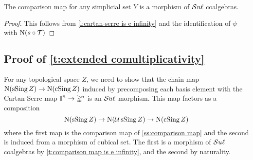 \begin{theorem} \label{t:comparison map is e infinity}
	The comparison map for any simplicial set $Y$ is a morphism of $\mathcal{S}u\ell$ coalgebras.
\end{theorem}

\begin{proof}
	This follows from \cref{l:cartan-serre is e infinity} and the identification of $\psi$ with $\operatorname{N}(s \circ \mathcal T)$
\end{proof}

\subsection{Proof of \cref{t:extended comultiplicativity}} \label{ss:proof extended comultiplicativity}

For any topological space $Z$, we need to show that the chain map $\operatorname{N}(\operatorname{sSing} Z) \to \operatorname{N}(\operatorname{cSing} Z)$ induced by precomposing each basis element with the Cartan-Serre map $\bm{\mathbb{I}}^n \to \mathbb{\Delta}^{\!n}$ is an $\mathcal{S}u\ell$ morphism.
This map factors as a composition
\begin{equation*}
\operatorname{N}(\operatorname{sSing} Z) \to \operatorname{N}(\operatorname{\mathcal{U}} \operatorname{sSing} Z) \to \operatorname{N}(\operatorname{cSing} Z)
\end{equation*}
where the first map is the comparison map of \cref{ss:comparison map} and the second is induced from a morphism of cubical set.
The first is a morphism of $\mathcal{S}u\ell$ coalgebras by \cref{t:comparison map is e infinity}, and the second by naturality.